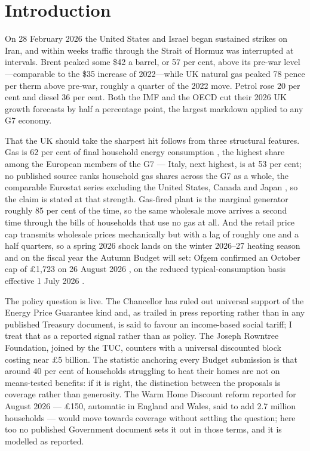\section{Introduction}
\label{sec:intro}

On 28 February 2026 the United States and Israel began sustained strikes on Iran, and within weeks traffic through the Strait of Hormuz was interrupted at intervals. Brent peaked some \$42 a barrel, or 57 per cent, above its pre-war level---comparable to the \$35 increase of 2022---while UK natural gas peaked 78 pence per therm above pre-war, roughly a quarter of the 2022 move. Petrol rose 20 per cent and diesel 36 per cent. Both the IMF and the OECD cut their 2026 UK growth forecasts by half a percentage point, the largest markdown applied to any G7 economy.

That the UK should take the sharpest hit follows from three structural features. Gas is 62 per cent of final household energy consumption \citep{desnz2025ecuk}, the highest share among the European members of the G7 --- Italy, next highest, is at 53 per cent; no published source ranks household gas shares across the G7 as a whole, the comparable Eurostat series excluding the United States, Canada and Japan \citep{eurostat2018}, so the claim is stated at that strength. Gas-fired plant is the marginal generator roughly 85 per cent of the time, so the same wholesale move arrives a second time through the bills of households that use no gas at all. And the retail price cap transmits wholesale prices mechanically but with a lag of roughly one and a half quarters, so a spring 2026 shock lands on the winter 2026--27 heating season and on the fiscal year the Autumn Budget will set: Ofgem confirmed an October cap of \pounds 1{,}723 on 26 August 2026 \citep{ofgem2026cap}, on the reduced typical-consumption basis effective 1 July 2026 \citep{ofgem2026tdcv}.

The policy question is live. The Chancellor has ruled out universal support of the Energy Price Guarantee kind and, as trailed in press reporting rather than in any published Treasury document, is said to favour an income-based social tariff; I treat that as a reported signal rather than as policy. The Joseph Rowntree Foundation, joined by the TUC, counters with a universal discounted block \citep{jrf2026} costing near \pounds 5 billion. The statistic anchoring every Budget submission is that around 40 per cent of households struggling to heat their homes are not on means-tested benefits: if it is right, the distinction between the proposals is coverage rather than generosity. The Warm Home Discount reform reported for August 2026 --- \pounds 150, automatic in England and Wales, said to add 2.7 million households --- would move towards coverage without settling the question; here too no published Government document sets it out in those terms, and it is modelled as reported.


